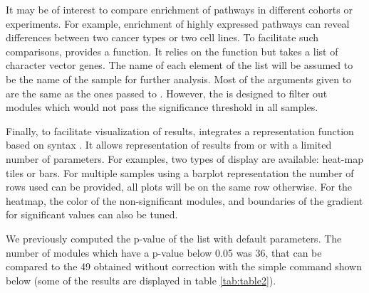 \documentclass[article]{jss}
\begin{document}


It may be of interest to compare enrichment of pathways in different cohorts or
experiments. For example, enrichment of highly expressed pathways can reveal
differences between two cancer types or two cell lines.  To facilitate such
comparisons,  provides a  function.
It relies on the  function but takes a list of character
vector genes. The name of each element of the list will be assumed to be the
name of the sample for further analysis.  Most of the arguments given to
 are the same as the ones passed to
. However, the  is designed to filter
out modules which would not pass the significance threshold in all samples.   


Finally, to facilitate visualization of results,  integrates a
representation function based on  syntax \citep{ggplot2}. It
allows representation of results from  or
 with a limited number of parameters. For
examples, two types of display are available: heat-map tiles or bars. For
multiple samples using a barplot representation the number of rows used can be
provided, all plots will be on the same row otherwise. For the heatmap, the
color of the non-significant modules, and boundaries of the gradient for
significant values can also be tuned.


We previously computed the p-value of the  list with default
parameters. The number of modules which have a p-value below 0.05 was 36, that
can be compared to the 49 obtained without correction with the simple command
shown below (some of the results are displayed in table \ref{tab:table2}).
\end{document}
